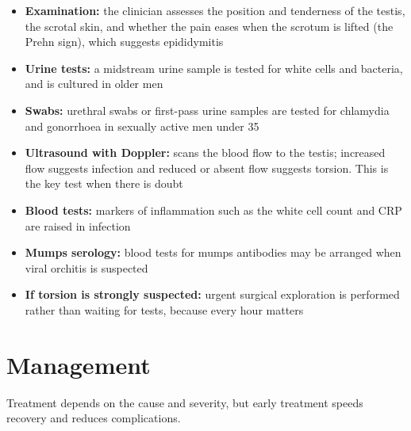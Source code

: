 \begin{itemize}
    \item \textbf{Examination:} the clinician assesses the position and tenderness of the testis, the scrotal skin, and whether the pain eases when the scrotum is lifted (the Prehn sign), which suggests epididymitis
    \item \textbf{Urine tests:} a midstream urine sample is tested for white cells and bacteria, and is cultured in older men
    \item \textbf{Swabs:} urethral swabs or first-pass urine samples are tested for chlamydia and gonorrhoea in sexually active men under 35
    \item \textbf{Ultrasound with Doppler:} scans the blood flow to the testis; increased flow suggests infection and reduced or absent flow suggests torsion. This is the key test when there is doubt
    \item \textbf{Blood tests:} markers of inflammation such as the white cell count and CRP are raised in infection
    \item \textbf{Mumps serology:} blood tests for mumps antibodies may be arranged when viral orchitis is suspected
    \item \textbf{If torsion is strongly suspected:} urgent surgical exploration is performed rather than waiting for tests, because every hour matters
\end{itemize}

\section*{Management}
Treatment depends on the cause and severity, but early treatment speeds recovery and reduces complications.

